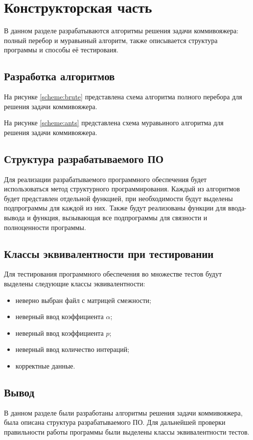 \chapter{Конструкторская часть}

В данном разделе разрабатываются алгоритмы решения задачи коммивояжера: полный
перебор и муравьиный алгоритм, также описывается структура программы и способы
её тестироваия.

\section{Разработка алгоритмов}

На рисунке \ref{scheme:brute} представлена схема алгоритма полного перебора для
решения задачи коммивояжера.

На рисунке \ref{scheme:ants} представлена схема муравьиного алгоритма для
решения задачи коммивояжера.

\noindent
{}
\noindent
{}

\clearpage
\section{Структура разрабатываемого ПО}

Для реализации разрабатываемого программного обеспечения будет использоваться
метод структурного программирования. Каждый из алгоритмов будет представлен
отдельной функцией, при необходимости будут выделены подпрограммы для каждой из
них. Также будут реализованы функции для ввода-вывода и функция, вызывающая все
подпрограммы для связности и полноценности программы.

\section{Классы эквивалентности при тестировании}

Для тестирования программного обеспечения во множестве тестов будут выделены
следующие классы эквивалентности:
\begin{itemize}[left=\parindent]
    \item неверно выбран файл с матрицей смежности; 
    \item неверный ввод коэффициента $\alpha$;
    \item неверный ввод коэффициента $p$;
    \item неверный ввод количество интераций;
    \item корректные данные.
\end{itemize}

\section{Вывод}

В данном разделе были разработаны алгоритмы решения задачи коммивояжера, была
описана структура разрабатываемого ПО. Для дальнейшей проверки правильности
работы программы были выделены классы эквивалентности тестов.
